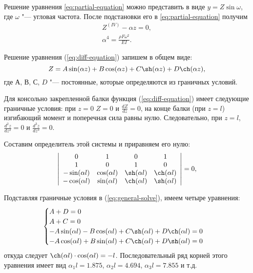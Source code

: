 Решение уравнения \eqref{eq:partial-equation} можно представить в виде $y = Z \sin \omega$, где $\omega$ "--- угловая частота.
После подстановки его в \eqref{eq:partial-equation} получим
\begin{align}
    Z^{(IV)} - \alpha z = 0, \label{eq:diff-equation} \\
    \alpha^4 = \frac{\rho F \omega^2}{E I}. \label{eq:alpha-equation}
\end{align}
    
Решение уравнения (\ref{eq:diff-equation}) запишем в общем виде:
\begin{equation}\label{eq:general-solve}
    Z = A \sin(\alpha z) + B \cos(\alpha z) + C \sh(\alpha z) + D \ch(\alpha z),
\end{equation}
где $А$, $В$, $С$, $D$ "--- постоянные, которые определяются из граничных условий.

Для консольно закрепленной балки функция (\ref{eq:diff-equation}) имеет следующие граничные условия: при $z = 0$ $Z = 0$ и $\frac{dZ}{dz} = 0$, на конце балки (при $z = l$) изгибающий момент и поперечная сила равны нулю.
Следовательно, при $z = l$, $\frac{d^2z}{dz^2} = 0$ и $\frac{d^3z}{dz^3}= 0$.

Составим определитель этой системы и приравняем его нулю:
\[
    \left|\begin{array}{cccc}
        0 & 1 & 0 & 1 \\
        1 & 0 & 1 & 0 \\
        -\sin (\alpha l) & \cos (\alpha l) & \sh (\alpha l) & \ch (\alpha l) \\
        -\cos (\alpha l) & \sin (\alpha l) & \ch (\alpha l) & \sh (\alpha l)
    \end{array}\right|
    = 0,
\]

Подставляя граничные условия в (\ref{eq:general-solve}), имеем четыре уравнения:
\begin{equation}
    \begin{cases}
        A + D = 0 \\
        A + C = 0 \\
        -A \sin (\alpha l) - B \cos (\alpha l) + C \sh (\alpha l) + D \ch (\alpha l) = 0 \\
        -A \cos (\alpha l) + B \sin (\alpha l) + C \ch (\alpha l) + D \sh (\alpha l) = 0
    \end{cases}
\end{equation}
откуда следует $\ch (\alpha l) \cdot \cos (\alpha l) = -l$.
Последовательный ряд корней этого уравнения имеет вид $\alpha_1 l = 1.875$, $\alpha_2 l = 4.694$, $\alpha_3 l = 7.855$ и т.д.

